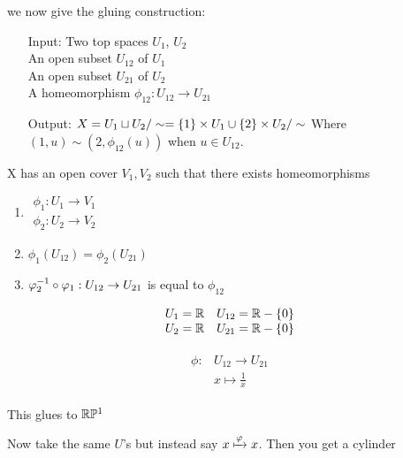 \documentclass[12pt, twosided]{article}
\begin{document}
we now give the gluing construction:

\begin{itemize}
\item [Input:] Two top spaces \(U_1\), \(U_2\) \\
  An open subset \(U_{12}\) of \(U_1\)\\
  An open subset \(U_{21}\) of \(U_2\)\\
  A homeomorphism \(\phi_{12}: U_{12} \to U_{21}\)
\item [Output:] \(X = U_1 \sqcup U_2 / \sim = \opn 1 \cls \times U_1 \cup \opn 2 \cls \times U_2 / \sim \) Where \((1, u) \sim (2, \phi_{12}(u))\) when \(u \in U_{12}\).
\end{itemize}

\begin{thm}
  X has an open cover \(V_1, V_2\) such that there exists homeomorphisms

  \begin{enumerate}
  \item
    \(\begin{matrix}
      \phi_1: U_1 \to V_1 \\
      \phi_2: U_2 \to V_2
    \end{matrix}\)
  \item\(\phi_1(U_{12}) = \phi_2(U_{21})\)
  \item \(\phi\1_2 \circ \phi_1 : U_{12} \to U_{21}\) is equal to \(\phi_{12}\)
  \end{enumerate}
\end{thm}

\begin{exa}
  \begin{align*}
    \begin{matrix}
      U_1 = \R & U_{12} = \R - \opn 0 \cls \\
      U_2 = \R & U_{21} = \R - \opn 0 \cls
    \end{matrix}
  \end{align*}

  \begin{align*}
    \begin{matrix}
      \phi:&U_{12} \to U_{21} \\
           &x \mapsto \frac{1}{x}
    \end{matrix}
  \end{align*}

  This glues to \(\R\P^1\) 
\end{exa}

\begin{exa}
  Now take the same \(U\)'s but instead say \(x \xmapsto{\phi} x\). Then you get a cylinder
\end{exa}
\end{document}
